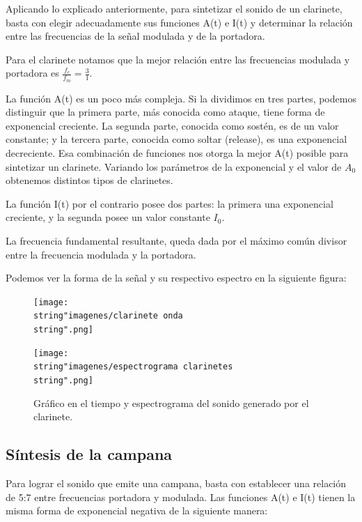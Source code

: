 \documentclass[../ASSD_TP2.tex]{subfiles}
\begin{document}
Aplicando lo explicado anteriormente, para sintetizar el sonido de
un clarinete, basta con elegir adecuadamente sus funciones A(t) e
I(t) y determinar la relación entre las frecuencias de la señal modulada
y de la portadora.

Para el clarinete notamos que la mejor relación entre las frecuencias
modulada y portadora es $\frac{f_{c}}{f_{m}}=\frac{3}{1}$. 

La función A(t) es un poco más compleja. Si la dividimos en tres partes,
podemos distinguir que la primera parte, más conocida como ataque,
tiene forma de exponencial creciente. La segunda parte, conocida como
sostén, es de un valor constante; y la tercera parte, conocida como
soltar (release), es una exponencial decreciente. Esa combinación
de funciones nos otorga la mejor A(t) posible para sintetizar un clarinete.
Variando los parámetros de la exponencial y el valor de $A_{0}$ obtenemos
distintos tipos de clarinetes.

La función I(t) por el contrario posee dos partes: la primera una
exponencial creciente, y la segunda posee un valor constante $I_{0}$.

La frecuencia fundamental resultante, queda dada por el máximo común
divisor entre la frecuencia modulada y la portadora.

Podemos ver la forma de la señal y su respectivo espectro en la siguiente
figura:

\begin{figure}[H]

\begin{centering}
\texttt{[image: \\string"imagenes/clarinete onda\\string".png]}
\par\end{centering}
\begin{centering}
\texttt{[image: \\string"imagenes/espectrograma clarinetes\\string".png]}\caption{Gráfico en el tiempo y espectrograma del sonido generado por el clarinete.}
\par\end{centering}
\end{figure}


\subsection{Síntesis de la campana}

Para lograr el sonido que emite una campana, basta con establecer
una relación de 5:7 entre frecuencias portadora y modulada. Las funciones
A(t) e I(t) tienen la misma forma de exponencial negativa de la siguiente
manera:
\end{document}
